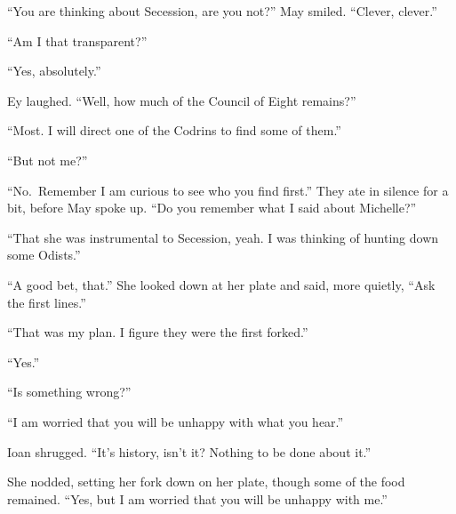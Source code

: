 ``You are thinking about Secession, are you not?'' May smiled. ``Clever, clever.''

``Am I that transparent?''

``Yes, absolutely.''

Ey laughed. ``Well, how much of the Council of Eight remains?''

``Most. I will direct one of the Codrins to find some of them.''

``But not me?''

``No.~Remember I am curious to see who you find first.'' They ate in silence for a bit, before May spoke up. ``Do you remember what I said about Michelle?''

``That she was instrumental to Secession, yeah. I was thinking of hunting down some Odists.''

``A good bet, that.'' She looked down at her plate and said, more quietly, ``Ask the first lines.''

``That was my plan. I figure they were the first forked.''

``Yes.''

``Is something wrong?''

``I am worried that you will be unhappy with what you hear.''

Ioan shrugged. ``It's history, isn't it? Nothing to be done about it.''

She nodded, setting her fork down on her plate, though some of the food remained. ``Yes, but I am worried that you will be unhappy with me.''
